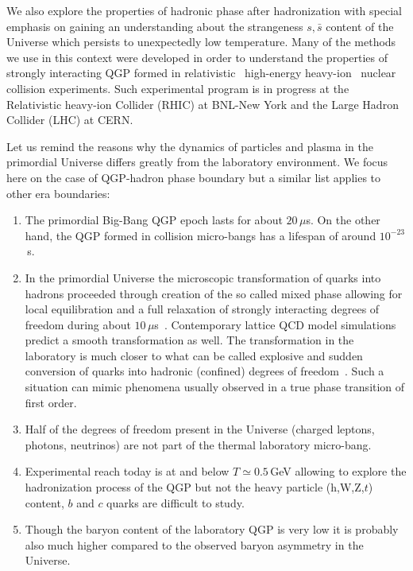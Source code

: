 We also explore the properties of hadronic phase after hadronization with special emphasis on gaining an understanding about the strangeness $s,\bar s$ content of the Universe which persists to unexpectedly low temperature. Many of the methods we use in this context were developed in order to understand the properties of strongly interacting QGP formed in relativistic \ie\ high-energy heavy-ion \ie\ nuclear collision experiments. Such experimental program is in progress at the Relativistic heavy-ion Collider (RHIC) at BNL-New York and the Large Hadron Collider (LHC) at CERN. 

Let us remind the reasons why the dynamics of particles and plasma in the primordial Universe differs greatly from the laboratory environment. We focus here on the case of QGP-hadron phase boundary but a similar list applies to other era boundaries:
\begin{enumerate} 
\item The primordial Big-Bang QGP epoch lasts for about $20\,\mu$s. On the other hand, the QGP formed in collision micro-bangs has a lifespan of around $10^{-23}$\,s. 
\item In the primordial Universe the microscopic transformation of quarks into hadrons proceeded through creation of the so called mixed phase allowing for local equilibration and a full relaxation of strongly interacting degrees of freedom during about $10\,\mu$s~\cite{Fromerth:2002wb}. Contemporary lattice QCD model simulations predict a smooth transformation as well. The transformation in the laboratory is much closer to what can be called explosive and sudden conversion of quarks into hadronic (confined) degrees of freedom~\cite{Rafelski:2000by}. Such a situation can mimic phenomena usually observed in a true phase transition of first order.
\item Half of the degrees of freedom present in the Universe (charged leptons, photons, neutrinos) are not part of the thermal laboratory micro-bang.
\item Experimental reach today is at and below $T\simeq 0.5$\,GeV allowing to explore the hadronization process of the QGP but not the heavy particle (h,W,Z,$t$) content, $b$ and $c$ quarks are difficult to study. 
\item Though the baryon content of the laboratory QGP is very low it is probably also much higher compared to the observed baryon asymmetry in the Universe. 
\end{enumerate}
 
